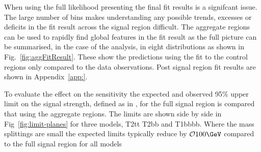 When using the full likelihood presenting the final fit results is
a signifcant issue. The large number of bins makes understanding any possible trends,
excesses or deficits in the fit result across the signal region difficult. 
The aggregate regions can be used to rapidly find global features in the fit result as
the full picture can be summarised, in the case of the \alphat analysis, 
in eight \mht distributions as shown in Fig.~\ref{fig:aggFitResult}. These
show the predictions using the fit to the control regions only compared to 
the data observations. Post signal region fit results are shown in Appendix~\ref{app:}.

To evaluate the effect on the sensitivity the expected and observed 95\% upper limit
on the signal strength, defined as in \cite{limit-stuff}, for the full signal region 
is compared that using the aggregate regions. The limits are shown side by side
in Fig~\ref{fig:limit-planes} for three models, T2tt T2bb and T1bbbb. Where the mass
splittings are small the expected limits typically reduce by $\mathcal{O} 100\GeV$ 
compared to the full signal region for all models  

